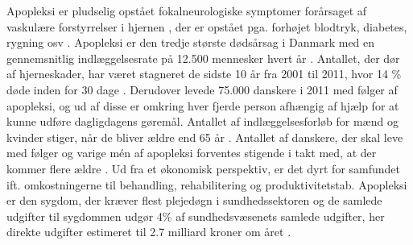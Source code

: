 Apopleksi er pludselig opstået fokalneurologiske symptomer forårsaget af vaskulære forstyrrelser i hjernen \cite{Sundhedsstyrelsen2009}, der er opstået pga. forhøjet blodtryk, diabetes, rygning osv \cite{Academic2015}. Apopleksi er den tredje største dødsårsag i Danmark med en gennemsnitlig indlæggelsesrate på 12.500 mennesker hvert år \cite{Hjernesagen2015a}. Antallet, der dør af hjerneskader, har været stagneret de sidste 10 år fra 2001 til 2011, hvor 14 \% døde inden for 30 dage \cite{Hjernesagen2015}. Derudover levede 75.000 danskere i 2011 med følger af apopleksi, og ud af disse er omkring hver fjerde person afhængig af hjælp for at kunne udføre dagligdagens gøremål\cite{Hjernesagen2015a}. Antallet af indlæggelsesforløb for mænd og kvinder stiger, når de bliver ældre end 65 år \cite{Sundhedsstyrelsen2011}.
Antallet af danskere, der skal leve med følger og varige mén af apopleksi forventes stigende i takt med, at der kommer flere ældre \cite{Sagen2014}. Ud fra et økonomisk perspektiv, er det dyrt for samfundet ift. omkostningerne til behandling, rehabilitering og produktivitetstab. Apopleksi er den sygdom, der kræver flest plejedøgn i sundhedssektoren \cite{Kruuse2014} og de samlede udgifter til sygdommen udgør 4\% af sundhedsvæsenets samlede udgifter, her direkte udgifter estimeret til 2.7 milliard kroner om året \cite{Hjernesagen2015a}. \\   

